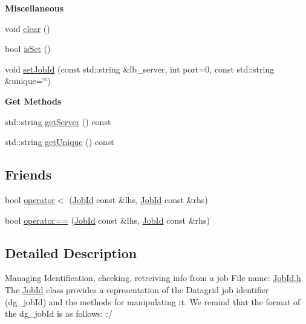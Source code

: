 \begin{Indent}{\bf Miscellaneous}\par
\begin{CompactItemize}
\item 
void \hyperlink{classglite_1_1wmsutils_1_1jobid_1_1JobId_z3_0}{clear} ()
\item 
bool \hyperlink{classglite_1_1wmsutils_1_1jobid_1_1JobId_z3_1}{is\-Set} ()
\item 
void \hyperlink{classglite_1_1wmsutils_1_1jobid_1_1JobId_z3_2}{set\-Job\-Id} (const std::string \&lb\_\-server, int port=0, const std::string \&unique=\char`\"{}\char`\"{})
\end{CompactItemize}
\end{Indent}
\begin{Indent}{\bf Get Methods}\par
\begin{CompactItemize}
\item 
std::string \hyperlink{classglite_1_1wmsutils_1_1jobid_1_1JobId_z5_0}{get\-Server} () const 
\item 
std::string \hyperlink{classglite_1_1wmsutils_1_1jobid_1_1JobId_z5_1}{get\-Unique} () const 
\end{CompactItemize}
\end{Indent}
\subsection*{Friends}
\begin{CompactItemize}
\item 
bool \hyperlink{classglite_1_1wmsutils_1_1jobid_1_1JobId_n0}{operator$<$} (\hyperlink{classglite_1_1wmsutils_1_1jobid_1_1JobId}{Job\-Id} const \&lhs, \hyperlink{classglite_1_1wmsutils_1_1jobid_1_1JobId}{Job\-Id} const \&rhs)
\item 
bool \hyperlink{classglite_1_1wmsutils_1_1jobid_1_1JobId_n1}{operator==} (\hyperlink{classglite_1_1wmsutils_1_1jobid_1_1JobId}{Job\-Id} const \&lhs, \hyperlink{classglite_1_1wmsutils_1_1jobid_1_1JobId}{Job\-Id} const \&rhs)
\end{CompactItemize}


\subsection{Detailed Description}
Managing Identification, checking, retreiving info from a job File name: \hyperlink{JobId_8h}{Job\-Id.h} The \hyperlink{classglite_1_1wmsutils_1_1jobid_1_1JobId}{Job\-Id} class provides a representation of the Datagrid job identifier (dg\_\-job\-Id) and the methods for manipulating it. We remind that the format of the dg\_\-job\-Id is as follows: :/

